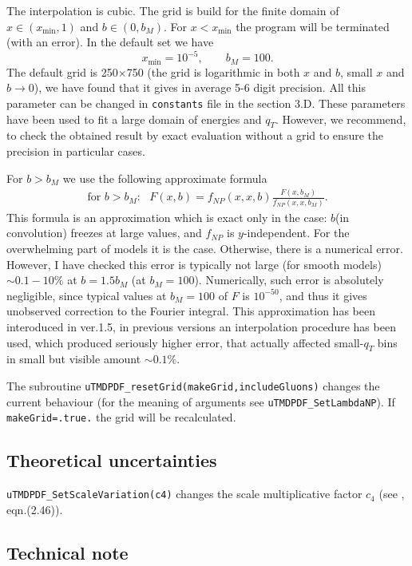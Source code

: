 \documentclass[prd,nofootinbib,eqsecnum,final]{revtex4}
\renewcommand{\(}{\left(}
\renewcommand{\)}{\right)}
\renewcommand{\[}{\left[}
\renewcommand{\]}{\right]}
\begin{document}
The interpolation is cubic. The grid is build for the finite domain of $x\in(x_{\min},1)$ and $b\in(0,b_M)$. For $x<x_{\min}$ the program will be terminated (with an error). In the default set we have
$$x_{\min}=10^{-5},\qquad b_M=100.$$
The default grid is 250$\times$750 (the grid is logarithmic in both $x$ and $b$, small $x$ and $b\to0$), we have found that it gives in average 5-6 digit precision. All this parameter can be changed in \texttt{constants} file in the section 3.D. These parameters have been used to fit a large domain of energies and $q_T$. However, we recommend, to check the obtained result by exact evaluation without a grid to ensure the precision in particular cases.


For $b>b_M$ we use the following approximate formula
\begin{eqnarray}
\text{for $b>b_M$}:~~~F(x,b)=f_{NP}(x,x,b)\frac{F(x,b_M)}{f_{NP}(x,x,b_M)}.
\end{eqnarray}
This formula is an approximation which is exact only in the case: $b$(in convolution) freezes at large values, and $f_{NP}$ is $y$-independent. For the overwhelming part of models it is the case. Otherwise, there is a numerical error. However, I have checked this error is typically not large (for smooth models) $\sim 0.1-10\%$ at $b=1.5 b_M$ (at $b_M=100$). Numerically, such error is absolutely negligible, since typical values at $b_M=100$ of $F$ is $10^{-50}$, and thus it gives unobserved correction to the Fourier integral. This approximation has been interoduced in ver.1.5, in previous versions an interpolation procedure has been used, which produced seriously higher error, that actually affected small-$q_T$ bins in small but visible amount $\sim 0.1\%$.

The subroutine \texttt{uTMDPDF\_resetGrid(makeGrid,includeGluons)} changes the current behaviour (for the meaning of arguments see  \texttt{uTMDPDF{\_}SetLambdaNP}). If \texttt{makeGrid=.true.} the grid will be recalculated.

\subsection{Theoretical uncertainties}

\texttt{uTMDPDF\_SetScaleVariation(c4)} changes the scale multiplicative factor $c_4$ (see \cite{Scimemi:2017etj}, eqn.(2.46)). 

\subsection{Technical note}
\label{sec:technicalNote_1}
\end{document}
